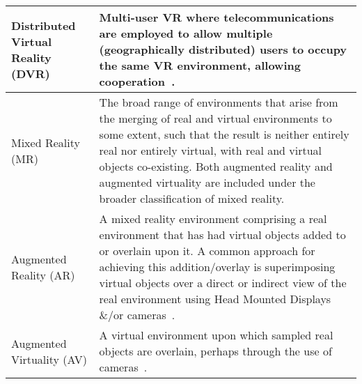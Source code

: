 \begin{center}
\begin{longtable}{| l | p{10cm} |}
\hline
		

Distributed Virtual Reality (DVR) & Multi-user VR where telecommunications are employed to allow multiple (geographically distributed) users to occupy the same VR environment, allowing cooperation~\cite{Terashima2001}. \\

\hline
		


Mixed Reality (MR) & The broad range of environments that arise from the merging of real and virtual environments to some extent, such that the result is neither entirely real nor entirely virtual, with real and virtual objects co-existing. Both augmented reality and augmented virtuality are included under the broader classification of mixed reality. \\

\hline
		

Augmented Reality (AR) & A mixed reality environment comprising a real environment that has had virtual objects added to or overlain upon it. A common approach for achieving this addition/overlay is superimposing virtual objects over a direct or indirect view of the real environment using Head Mounted Displays \&/or cameras~\cite{Krevelen2010}. \\



\hline


Augmented Virtuality (AV) & A virtual environment upon which sampled real objects are overlain, perhaps through the use of cameras~\cite{caballero:behand}. \\



\end{longtable}
\end{center}
